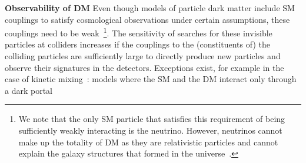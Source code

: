 \begin{textbox}[!h]
\textbf{Observability of DM}
Even though models of particle dark matter include SM couplings to satisfy cosmological observations under certain assumptions, these couplings need to be weak~\footnote{We note that the only SM particle that satisfies this requirement of being sufficiently weakly interacting is the neutrino. However, neutrinos cannot make up the totality of DM as they are relativistic particles and cannot explain the galaxy structures that formed in the  universe~\cite{PlehnLecturesDM}.}.
The sensitivity of searches for these invisible particles at colliders increases if the couplings to the (constituents of) the colliding particles are sufficiently large to directly produce new particles and observe their signatures in the detectors. Exceptions exist, for example in the case of kinetic mixing~\cite{Holdom:1985ag}: models where the SM and the DM interact only through a dark portal
\end{textbox}